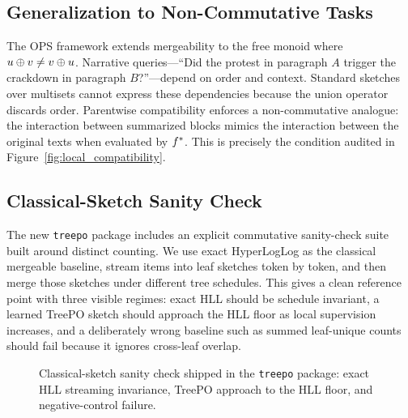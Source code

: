 \subsection{Generalization to Non-Commutative Tasks}

The OPS framework extends mergeability to the free monoid where $u\oplus v\neq v\oplus u$. Narrative queries---``Did the protest in paragraph $A$ trigger the crackdown in paragraph $B$?''---depend on order and context. Standard sketches over multisets cannot express these dependencies because the union operator discards order. Parentwise compatibility enforces a non-commutative analogue: the interaction between summarized blocks mimics the interaction between the original texts when evaluated by $f^{\ast}$. This is precisely the condition audited in Figure~\ref{fig:local_compatibility}.

\subsection{Classical-Sketch Sanity Check}

The new \texttt{treepo} package includes an explicit commutative sanity-check suite built around distinct counting. We use exact HyperLogLog as the classical mergeable baseline, stream items into leaf sketches token by token, and then merge those sketches under different tree schedules. This gives a clean reference point with three visible regimes: exact HLL should be schedule invariant, a learned TreePO sketch should approach the HLL floor as local supervision increases, and a deliberately wrong baseline such as summed leaf-unique counts should fail because it ignores cross-leaf overlap.

\begin{figure}[t]
    \centering
    \setlength{\fboxsep}{6pt}
    \hfill
    \hfill
    \caption{Classical-sketch sanity check shipped in the \texttt{treepo} package: exact HLL streaming invariance, TreePO approach to the HLL floor, and negative-control failure.}
    \label{fig:treepo-cardinality-sanity}
\end{figure}


